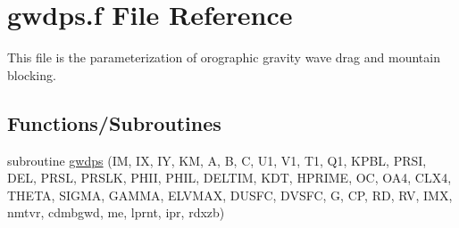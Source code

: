 \hypertarget{gwdps_8f}{}\section{gwdps.\+f File Reference}
\label{gwdps_8f}


This file is the parameterization of orographic gravity wave drag and mountain blocking.  


\subsection*{Functions/\+Subroutines}
\begin{DoxyCompactItemize}
\item 
subroutine \hyperlink{group___g_f_s__ogwd_ga82eda62e1bdee0a0ab6a831fc53ae89c}{gwdps} (IM, IX, IY, KM, A, B, C, U1, V1, T1, Q1, K\+P\+BL, P\+R\+SI, D\+EL, P\+R\+SL, P\+R\+S\+LK, P\+H\+II, P\+H\+IL, D\+E\+L\+T\+IM, K\+DT, H\+P\+R\+I\+ME, OC, O\+A4, C\+L\+X4, T\+H\+E\+TA, S\+I\+G\+MA, G\+A\+M\+MA, E\+L\+V\+M\+AX, D\+U\+S\+FC, D\+V\+S\+FC, G, CP, RD, RV, I\+MX, nmtvr, cdmbgwd, me, lprnt, ipr, rdxzb)
\end{DoxyCompactItemize}

